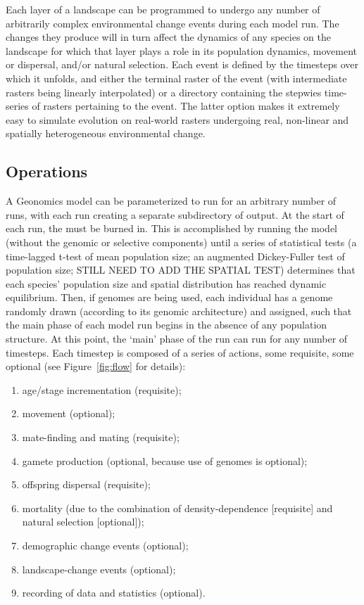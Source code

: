 ﻿\documentclass{article}
\begin{document}
Each layer of a landscape can be programmed to undergo any number of
arbitrarily complex environmental change events during each model run.
The changes they produce will in turn affect the dynamics
of any species on the landscape for which that layer plays a role in its
population dynamics, movement or dispersal, and/or natural selection.
Each event is defined by the timesteps over which it unfolds, and either the terminal
raster of the event (with intermediate rasters being linearly interpolated) 
or a directory containing the stepwies time-series of rasters pertaining to the event.
The latter option makes it extremely easy to simulate evolution on real-world
rasters undergoing real, non-linear and spatially heterogeneous environmental change.


\subsection{Operations}
A Geonomics model can be parameterized to run for an arbitrary number of runs,
with each run creating a separate subdirectory of output.
At the start of each run, the must be burned in.
This is accomplished by running the model (without the genomic or
selective components) until a series of statistical tests 
(a time-lagged t-test of mean population size;
an augmented Dickey-Fuller test of population size;
{\large STILL NEED TO ADD THE SPATIAL TEST}) determines that each species'
population size and spatial distribution has reached dynamic equilibrium.
Then, if genomes are being used, each individual has a genome randomly drawn
(according to its genomic architecture) and assigned, such that the main phase
of each model run begins in the absence of any population structure.
At this point, the `main' phase of the run can run for any number of timesteps. 
Each timestep is composed of a series of actions, some requisite, some optional
(see Figure~\ref{fig:flow} for details):
\begin{enumerate}
  \item age/stage incrementation (requisite);
  \item movement (optional);
  \item mate-finding and  mating (requisite);
  \item gamete production (optional, because use of genomes is optional);
  \item offspring dispersal (requisite);
  \item mortality (due to the combination of density-dependence [requisite] and natural selection [optional]);
  \item demographic change events (optional);
  \item landscape-change events (optional);
  \item recording of data and statistics (optional). 
\end{enumerate}
\end{document}
